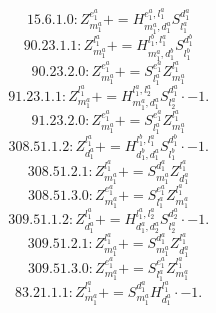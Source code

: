 \documentclass[letterpaper,10pt,fleqn,leqno,onecolumn]{article}
\begin{document}
\begin{equation} \;\;\;\;\;\;  15.6.1.0: Z^{e_{1}^{a}}_{m_{1}^{a}}+=H^{e_{1}^{a},l_{1}^{a}}_{m_{1}^{a},d_{1}^{a}}S^{d_{1}^{a}}_{l_{1}^{a}} \end{equation}
\begin{equation} \;\;\;\;\;\;  90.23.1.1: Z^{l_{1}^{a}}_{m_{1}^{a}}+=H^{l_{1}^{b},l_{1}^{a}}_{m_{1}^{a},d_{1}^{b}}S^{d_{1}^{b}}_{l_{1}^{b}} \end{equation}
\begin{equation} \;\;\;\;\;\;  90.23.2.0: Z^{e_{1}^{a}}_{m_{1}^{a}}+=S^{e_{1}^{a}}_{l_{1}^{a}}Z^{l_{1}^{a}}_{m_{1}^{a}} \end{equation}
\begin{equation} \;\;\;\;\;\;  91.23.1.1: Z^{l_{1}^{a}}_{m_{1}^{a}}+=H^{l_{1}^{a},l_{2}^{a}}_{m_{1}^{a},d_{1}^{a}}S^{d_{1}^{a}}_{l_{2}^{a}}\cdot -1. \end{equation}
\begin{equation} \;\;\;\;\;\;  91.23.2.0: Z^{e_{1}^{a}}_{m_{1}^{a}}+=S^{e_{1}^{a}}_{l_{1}^{a}}Z^{l_{1}^{a}}_{m_{1}^{a}} \end{equation}
\begin{equation} \;\;\;\;\;\;  308.51.1.2: Z^{l_{1}^{a}}_{d_{1}^{a}}+=H^{l_{1}^{b},l_{1}^{a}}_{d_{1}^{b},d_{1}^{a}}S^{d_{1}^{b}}_{l_{1}^{b}}\cdot -1. \end{equation}
\begin{equation} \;\;\;\;\;\;  308.51.2.1: Z^{l_{1}^{a}}_{m_{1}^{a}}+=S^{d_{1}^{a}}_{m_{1}^{a}}Z^{l_{1}^{a}}_{d_{1}^{a}} \end{equation}
\begin{equation} \;\;\;\;\;\;  308.51.3.0: Z^{e_{1}^{a}}_{m_{1}^{a}}+=S^{e_{1}^{a}}_{l_{1}^{a}}Z^{l_{1}^{a}}_{m_{1}^{a}} \end{equation}
\begin{equation} \;\;\;\;\;\;  309.51.1.2: Z^{l_{1}^{a}}_{d_{1}^{a}}+=H^{l_{1}^{a},l_{2}^{a}}_{d_{1}^{a},d_{2}^{a}}S^{d_{2}^{a}}_{l_{2}^{a}}\cdot -1. \end{equation}
\begin{equation} \;\;\;\;\;\;  309.51.2.1: Z^{l_{1}^{a}}_{m_{1}^{a}}+=S^{d_{1}^{a}}_{m_{1}^{a}}Z^{l_{1}^{a}}_{d_{1}^{a}} \end{equation}
\begin{equation} \;\;\;\;\;\;  309.51.3.0: Z^{e_{1}^{a}}_{m_{1}^{a}}+=S^{e_{1}^{a}}_{l_{1}^{a}}Z^{l_{1}^{a}}_{m_{1}^{a}} \end{equation}
\begin{equation} \;\;\;\;\;\;  83.21.1.1: Z^{l_{1}^{a}}_{m_{1}^{a}}+=S^{d_{1}^{a}}_{m_{1}^{a}}H^{l_{1}^{a}}_{d_{1}^{a}}\cdot -1. \end{equation}
\end{document}
